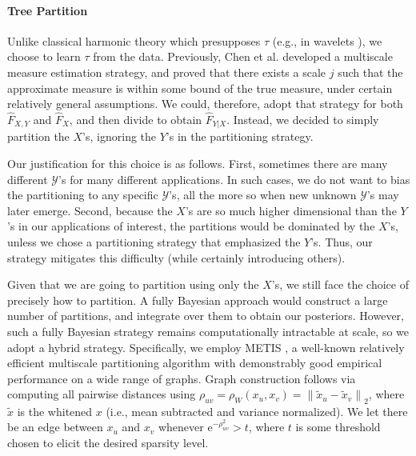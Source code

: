 \documentclass{article} %
\providecommand{\mh}[1]{\hat{#1}}
\providecommand{\mc}[1]{\mathcal{#1}}
\providecommand{\mt}[1]{\widetilde{#1}}
\providecommand{\norm}[1]{\left \lVert#1 \right  \rVert}
\begin{document}
	\paragraph{Tree Partition} Unlike classical harmonic theory which presupposes $\tau$ (e.g., in wavelets \cite{Daubechies1992}), we choose to learn $\tau$ from the data. Previously, Chen et al. \cite{ChenMaggioni12} developed a multiscale measure estimation strategy, and proved that there exists a scale $j$ such that the approximate measure is within some bound of the true measure, under certain relatively general assumptions.  We could, therefore, adopt that strategy for both $\mh{F}_{X,Y}$ and $\mh{F}_{X}$, and then divide to obtain $\mh{F}_{Y|X}$.  Instead, we decided to simply partition the $X$'s, ignoring the $Y$'s in the partitioning strategy.  
	
	Our justification for this choice is as follows. First, sometimes there are many different $\mc{Y}$'s for many different applications.  In such cases, we do not want to bias the partitioning to any specific $\mc{Y}$'s, all the more so when new unknown $\mc{Y}$'s may later emerge.  Second, because the $X$'s are so much higher dimensional than the $Y$'s in our applications of interest, the partitions would be dominated by the $X$'s, unless we chose a partitioning strategy that emphasized the $Y$'s.  Thus, our strategy mitigates this difficulty (while certainly introducing others). 

	Given that we are going to partition using only the $X$'s, we still face the choice of precisely how to partition.  A fully Bayesian approach would construct a large number of partitions, and integrate over them to obtain our posteriors.  However, such a fully Bayesian strategy remains  computationally intractable at scale, so we adopt a hybrid strategy.  Specifically, we employ METIS \cite{METIS}, a well-known relatively efficient multiscale partitioning algorithm with demonstrably good empirical performance on a wide range of graphs.  Graph construction follows via computing all pairwise distances using $\rho_{uv}=\rho_W(x_u,x_v)=\norm{\mt{x}_u-\mt{x}_v}_2$, where $\mt{x}$ is the whitened $x$ (i.e., mean subtracted and variance normalized). We let there be an edge between $x_u$ and $x_v$ whenever  e$^{-\rho_{uv}^2} > t$, where $t$ is some threshold chosen to elicit the desired sparsity level.
	
\end{document}
